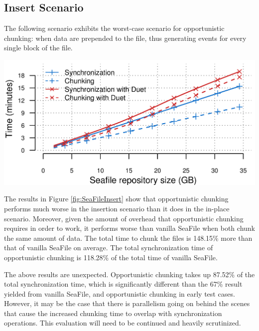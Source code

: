 \documentclass[table]{article}
\newenvironment{Figure}
  {\par\medskip\noindent\minipage{\linewidth}}
  {\endminipage\par\medskip}
\begin{document}
\begin{multicols}{2}
\subsection{Insert Scenario}


The following scenario exhibits the worst-case scenario for opportunistic chunking: when data are prepended to the file, thus generating events for every single block of the file.

\begin{Figure}
 \centering
 \includegraphics[width=\linewidth]{insert.png}
 \label{fig:SeaFileInsert}
\end{Figure}

The results in Figure \ref{fig:SeaFileInsert} show that opportunistic chunking performs much worse in the insertion scenario than it does in the in-place scenario. Moreover, given the amount of overhead that opportunistic chunking requires in order to work, it performs worse than vanilla SeaFile when both chunk the same amount of data. The total time to chunk the files is 148.15\% more than that of vanilla SeaFile on average. The total synchronization time of opportunistic chunking is 118.28\% of the total time of vanilla SeaFile.

The above results are unexpected. Opportunistic chunking takes up 87.52\% of the total synchronization time, which is significantly different than the 67\% result yielded from vanilla SeaFile, and opportunistic chunking in early test cases. However, it may be the case that there is parallelism going on behind the scenes that cause the increased chunking time to overlap with synchronization operations. This evaluation will need to be continued and heavily scrutinized.


\end{multicols}
\end{document}
